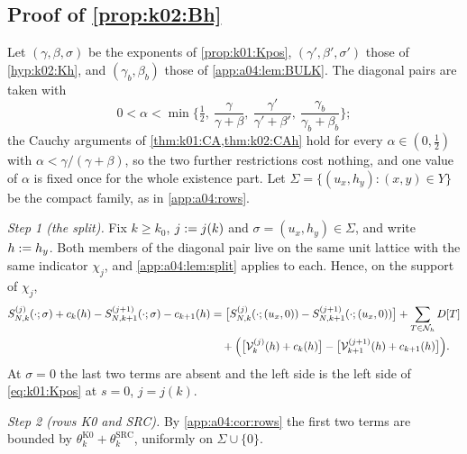 \subsection{Proof of \texorpdfstring{\cref{prop:k02:Bh}}{the proposition}}\label{app:a04:assembly}

Let $(\gamma,\beta,\sigma)$ be the exponents of \cref{prop:k01:Kpos}, $(\gamma',\beta',\sigma')$ those of \cref{hyp:k02:Kh}, and $(\gamma_b,\beta_b)$ those of \cref{app:a04:lem:BULK}. The diagonal pairs are taken with
\begin{equation}\label{app:a04:eq:alpha}
0<\alpha<\min\Big\{\tfrac12,\ \frac\gamma{\gamma+\beta},\ \frac{\gamma'}{\gamma'+\beta'},\ \frac{\gamma_b}{\gamma_b+\beta_b}\Big\};
\end{equation}
the Cauchy arguments of \cref{thm:k01:CA,thm:k02:CAh} hold for every $\alpha\in(0,\frac12)$ with $\alpha<\gamma/(\gamma+\beta)$, so the two further restrictions cost nothing, and one value of $\alpha$ is fixed once for the whole existence part. Let $\Sigma=\{(u_x,h_y):(x,y)\in Y\}$ be the compact family, as in \cref{app:a04:rows}.

\emph{Step 1 (the split).} Fix $k\ge k_0$, $j:= j(k)$ and $\sigma=(u_x,h_y)\in\Sigma$, and write $h:= h_y$. Both members of the diagonal pair live on the same unit lattice with the same indicator $\chi_j$, and \cref{app:a04:lem:split} applies to each. Hence, on the support of $\chi_j$,
\begin{align*}
S^{(j)}_{N,k}(\cdot;\sigma)+c_k(h)-S^{(j+1)}_{N,k+1}(\cdot;\sigma)-c_{k+1}(h)
&=\big[S^{(j)}_{N,k}(\cdot;(u_x,0))-S^{(j+1)}_{N,k+1}(\cdot;(u_x,0))\big]+\sum_{T\in\mathcal N_h}D[T]\\
&\quad+\Big(\big[\mathcal V^{(j)}_k(h)+c_k(h)\big]-\big[\mathcal V^{(j+1)}_{k+1}(h)+c_{k+1}(h)\big]\Big).
\end{align*}
At $\sigma=0$ the last two terms are absent and the left side is the left side of \eqref{eq:k01:Kpos} at $s=0$, $j=j(k)$.

\emph{Step 2 (rows K0 and SRC).} By \cref{app:a04:cor:rows} the first two terms are bounded by $\theta^{\mathrm{K0}}_k+\theta^{\mathrm{SRC}}_k$, uniformly on $\Sigma\cup\{0\}$.

